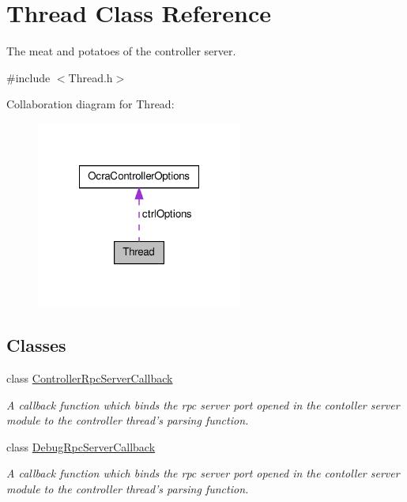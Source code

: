 \hypertarget{classThread}{\section{\-Thread \-Class \-Reference}
\label{classThread}
}


\-The meat and potatoes of the controller server.  




{\ttfamily \#include $<$\-Thread.\-h$>$}



\-Collaboration diagram for \-Thread\-:
\nopagebreak
\begin{figure}[H]
\begin{center}
\leavevmode
\includegraphics[width=192pt]{classThread__coll__graph}
\end{center}
\end{figure}
\subsection*{\-Classes}
\begin{DoxyCompactItemize}
\item 
class \hyperlink{classThread_1_1ControllerRpcServerCallback}{\-Controller\-Rpc\-Server\-Callback}
\begin{DoxyCompactList}\small\item\em \-A callback function which binds the rpc server port opened in the contoller server module to the controller thread's parsing function. \end{DoxyCompactList}\item 
class \hyperlink{classThread_1_1DebugRpcServerCallback}{\-Debug\-Rpc\-Server\-Callback}
\begin{DoxyCompactList}\small\item\em \-A callback function which binds the rpc server port opened in the contoller server module to the controller thread's parsing function. \end{DoxyCompactList}\end{DoxyCompactItemize}
